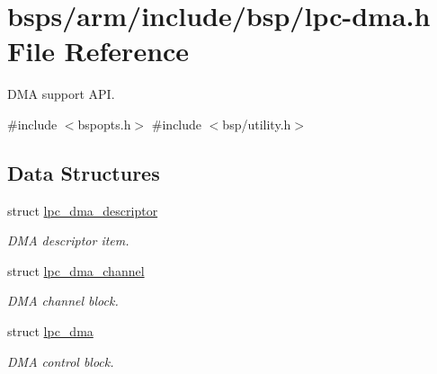 \hypertarget{lpc-dma_8h}{}\section{bsps/arm/include/bsp/lpc-\/dma.h File Reference}
\label{lpc-dma_8h}


D\+MA support A\+PI.  


{\ttfamily \#include $<$bspopts.\+h$>$}\newline
{\ttfamily \#include $<$bsp/utility.\+h$>$}\newline
\subsection*{Data Structures}
\begin{DoxyCompactItemize}
\item 
struct \mbox{\hyperlink{structlpc__dma__descriptor}{lpc\+\_\+dma\+\_\+descriptor}}
\begin{DoxyCompactList}\small\item\em D\+MA descriptor item. \end{DoxyCompactList}\item 
struct \mbox{\hyperlink{structlpc__dma__channel}{lpc\+\_\+dma\+\_\+channel}}
\begin{DoxyCompactList}\small\item\em D\+MA channel block. \end{DoxyCompactList}\item 
struct \mbox{\hyperlink{structlpc__dma}{lpc\+\_\+dma}}
\begin{DoxyCompactList}\small\item\em D\+MA control block. \end{DoxyCompactList}\end{DoxyCompactItemize}
